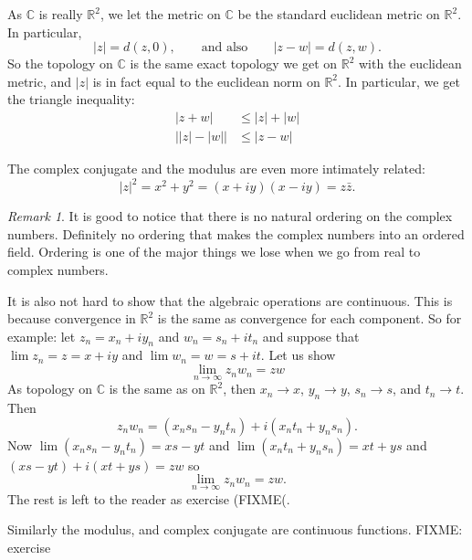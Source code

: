 \documentclass[12pt]{book}
\newcommand{\sabs}[1]{\lvert {#1} \rvert}
\newcommand{\C}{{\mathbb{C}}}
\newcommand{\R}{{\mathbb{R}}}
\theoremstyle{plain}
\theoremstyle{remark}
\newtheorem{remark}[thm]{Remark}
\theoremstyle{definition}
\theoremstyle{exercise}
\theoremstyle{example}
\begin{document}
As $\C$ is really $\R^2$, we let the metric on $\C$ be the standard
euclidean metric on $\R^2$.
In particular,
\begin{equation*}
\sabs{z} = d(z,0) , \qquad 
\text{and also} \qquad 
\sabs{z-w} = d(z,w) .
\end{equation*}
So the topology on $\C$ is
the same exact topology we get on $\R^2$ with the euclidean metric,
and $\sabs{z}$ is in fact equal to the euclidean norm on $\R^2$.
In particular, we get the triangle inequality:
\begin{align*}
\sabs{z+w} & \leq \sabs{z}+\sabs{w} \\
\big\lvert \sabs{z}-\sabs{w} \big\rvert & \leq \sabs{z-w}
\end{align*}

The complex conjugate and the modulus are even more intimately related:
\begin{equation*}
\sabs{z}^2 =
x^2+y^2 =
(x+iy)(x-iy) =
z \bar{z} .
\end{equation*}

\begin{remark}
It is good to notice that there is no natural ordering on the complex numbers.
Definitely no ordering that makes the complex numbers into an ordered field.
Ordering is one of the major things we lose when we go from real to complex
numbers.
\end{remark}

It is also not hard to show that the algebraic operations are
continuous.  This is because convergence in 
$\R^2$ is the same as convergence for each component.  So for example:
let $z_n = x_n + iy_n$ and
$w_n = s_n + it_n$ and suppose that
$\lim z_n = z = x+iy$ and $\lim w_n = w = s+it$.
Let us show
\begin{equation*}
\lim_{n\to\infty} z_n w_n = zw
\end{equation*}
As topology on $\C$ is the same as on $\R^2$, then
$x_n \to x$, $y_n \to y$, $s_n \to s$, and $t_n \to t$.  Then
\begin{equation*}
z_n w_n = (x_ns_n-y_nt_n) + i(x_nt_n+y_ns_n) .
\end{equation*}
Now 
$\lim (x_ns_n-y_nt_n) = xs-yt$ and
$\lim (x_nt_n+y_ns_n) = xt+ys$ and
$(xs-yt)+i(xt+ys) = zw$ so
\begin{equation*}
\lim_{n\to\infty} z_n w_n = zw .
\end{equation*}
The rest is left to the reader as exercise (FIXME(.

Similarly the modulus, and complex conjugate are continuous functions.
FIXME: exercise
\end{document}
